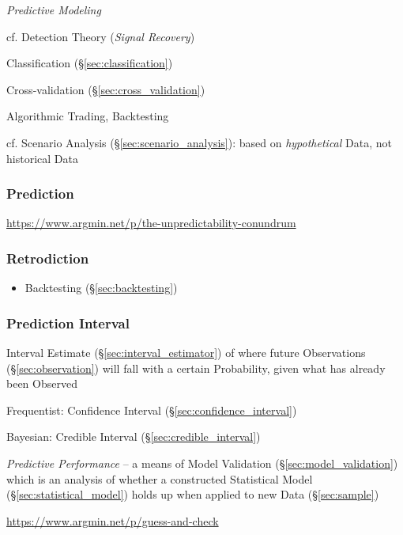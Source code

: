 \emph{Predictive Modeling}

cf. Detection Theory (\emph{Signal Recovery}) %

Classification (\S\ref{sec:classification})

Cross-validation (\S\ref{sec:cross_validation})

Algorithmic Trading, Backtesting

cf. Scenario Analysis (\S\ref{sec:scenario_analysis}): based on
\emph{hypothetical} Data, not historical Data



\subsubsection{Prediction}\label{sec:prediction}

\url{https://www.argmin.net/p/the-unpredictability-conundrum}



\subsubsection{Retrodiction}\label{sec:retrodiction}

\begin{itemize}
  \item Backtesting (\S\ref{sec:backtesting})
\end{itemize}



\subsubsection{Prediction Interval}\label{sec:prediction_interval}\hfill

Interval Estimate (\S\ref{sec:interval_estimator}) of where future Observations
(\S\ref{sec:observation}) will fall with a certain Probability, given what has
already been Observed

Frequentist: Confidence Interval (\S\ref{sec:confidence_interval})

Bayesian: Credible Interval (\S\ref{sec:credible_interval})

\emph{Predictive Performance} -- a means of Model Validation
(\S\ref{sec:model_validation}) which is an analysis of whether a constructed
Statistical Model (\S\ref{sec:statistical_model}) holds up when applied to new
Data (\S\ref{sec:sample})

\url{https://www.argmin.net/p/guess-and-check}


